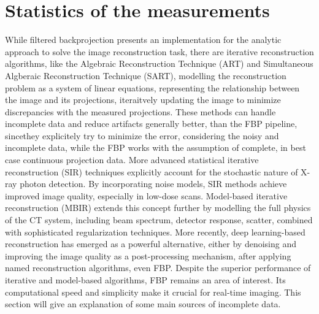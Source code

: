 \documentclass[12pt,a4paper]{article}
\begin{document}
\section{Statistics of the measurements}
\label{imageartifacts}
While filtered backprojection presents an implementation for the analytic approach to solve the image reconstruction task, there are iterative reconstruction algorithms, like the Algebraic Reconstruction Technique (ART) and Simultaneous Algberaic Reconstruction Technique (SART), modelling the reconstruction problem as a system of linear equations, representing the relationship between the image and its projections, iteraitvely updating the image to minimize discrepancies with the measured projections. These methods can handle incomplete data and reduce artifacts generally better, than the FBP pipeline, sincethey explicitely try to minimize the error, considering the noisy and incomplete data, while the FBP works with the assumption of complete, in best case continuous projection data. More advanced statistical iterative reconstruction (SIR) techniques explicitly account for the stochastic nature of X-ray photon detection. By incorporating noise models, SIR methods achieve improved image quality, especially in low-dose scans. Model-based iterative reconstruction (MBIR) extends this concept further by modelling the full physics of the CT system, including beam spectrum, detector response, scatter, combined with sophisticated regularization techniques. More recently, deep learning-based reconstruction has emerged as a powerful alternative, either by denoising and improving the image quality as a post-processing mechanism, after applying named reconstruction algorithms, even FBP. Despite the superior performance of iterative and model-based algorithms, FBP remains an area of interest. Its computational speed and simplicity make it crucial for real-time imaging. This section will give an explanation of some main sources of incomplete data.
\end{document}

